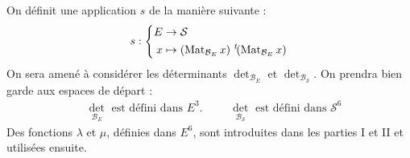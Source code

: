 On définit une application $s$ de la manière suivante :
\begin{displaymath}
 s : 
\left\lbrace
\begin{aligned}
 E &\rightarrow \mathcal S \\
 x &\mapsto (\operatorname{Mat}_{\mathcal B_E}x)\, \,\mathstrut^t\! (\operatorname{Mat}_{\mathcal B_E}x)
\end{aligned}
 \right. 
\end{displaymath}
On sera amené à considérer les déterminants $\det_{\mathcal B_{E}}$ et $\det_{\mathcal B_{\mathcal S}}$. On prendra bien garde aux espaces de départ :
\begin{align*}
 &\det_{\mathcal B_{E}}\text{ est défini dans } E^3. & & 
 &\det_{\mathcal B_{\mathcal S}}\text{ est défini dans } \mathcal S^6 
\end{align*}
Des fonctions $\lambda$ et $\mu$, définies dans $E^6$, sont introduites dans les parties I et II et utilisées ensuite.
